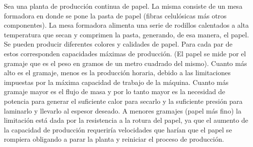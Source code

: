 Sea una planta de producción continua de papel. La misma consiste de un mesa formadora en donde se pone la pasta de papel (fibras celulósicas más otros componentes). La mesa formadora alimenta una serie de rodillos calentados a alta temperatura que secan y comprimen la pasta, generando, de esa manera, el papel. Se pueden producir diferentes colores y calidades de papel. Para cada par de estos corresponden capacidades máximas de producción. (El papel se mide por el gramaje que es el peso en gramos de un metro cuadrado del mismo). Cuanto más alto es el gramaje, menos es la producción horaria, debido a las limitaciones impuestas por la máxima capacidad de trabajo de la máquina. Cuanto más gramaje mayor es el flujo de masa y por lo tanto mayor es la necesidad de potencia para generar el suficiente calor para secarlo y la suficiente presión para laminarlo y llevarlo al espesor deseado. A menores gramajes (papel más fino) la limitación está dada por la resistencia a la rotura del papel, ya que el aumento de la capacidad de producción requeriría velocidades que harían que el papel se rompiera obligando a parar la planta y reiniciar el proceso de producción.